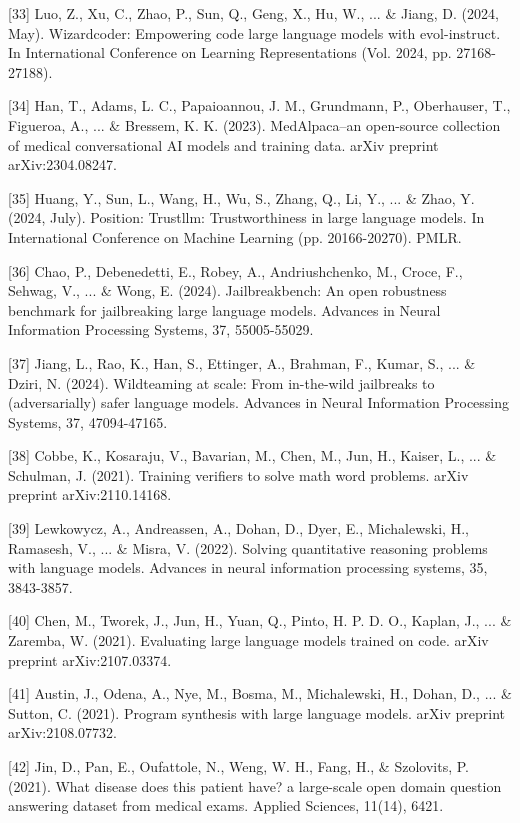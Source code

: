 \documentclass{article}
\begin{document}
{[33] Luo, Z., Xu, C., Zhao, P., Sun, Q., Geng, X., Hu, W., ... \& Jiang, D. (2024, May). Wizardcoder: Empowering code large language models with evol-instruct. In International Conference on Learning Representations (Vol. 2024, pp. 27168-27188).

[34] Han, T., Adams, L. C., Papaioannou, J. M., Grundmann, P., Oberhauser, T., Figueroa, A., ... \& Bressem, K. K. (2023). MedAlpaca--an open-source collection of medical conversational AI models and training data. arXiv preprint arXiv:2304.08247.

[35] Huang, Y., Sun, L., Wang, H., Wu, S., Zhang, Q., Li, Y., ... \& Zhao, Y. (2024, July). Position: Trustllm: Trustworthiness in large language models. In International Conference on Machine Learning (pp. 20166-20270). PMLR.

[36] Chao, P., Debenedetti, E., Robey, A., Andriushchenko, M., Croce, F., Sehwag, V., ... \& Wong, E. (2024). Jailbreakbench: An open robustness benchmark for jailbreaking large language models. Advances in Neural Information Processing Systems, 37, 55005-55029.

[37] Jiang, L., Rao, K., Han, S., Ettinger, A., Brahman, F., Kumar, S., ... \& Dziri, N. (2024). Wildteaming at scale: From in-the-wild jailbreaks to (adversarially) safer language models. Advances in Neural Information Processing Systems, 37, 47094-47165.

[38] Cobbe, K., Kosaraju, V., Bavarian, M., Chen, M., Jun, H., Kaiser, L., ... \& Schulman, J. (2021). Training verifiers to solve math word problems. arXiv preprint arXiv:2110.14168.

[39] Lewkowycz, A., Andreassen, A., Dohan, D., Dyer, E., Michalewski, H., Ramasesh, V., ... \& Misra, V. (2022). Solving quantitative reasoning problems with language models. Advances in neural information processing systems, 35, 3843-3857.

[40] Chen, M., Tworek, J., Jun, H., Yuan, Q., Pinto, H. P. D. O., Kaplan, J., ... \& Zaremba, W. (2021). Evaluating large language models trained on code. arXiv preprint arXiv:2107.03374.

[41] Austin, J., Odena, A., Nye, M., Bosma, M., Michalewski, H., Dohan, D., ... \& Sutton, C. (2021). Program synthesis with large language models. arXiv preprint arXiv:2108.07732.

[42] Jin, D., Pan, E., Oufattole, N., Weng, W. H., Fang, H., \& Szolovits, P. (2021). What disease does this patient have? a large-scale open domain question answering dataset from medical exams. Applied Sciences, 11(14), 6421.

}
\end{document}
